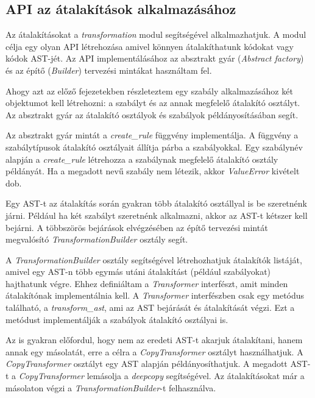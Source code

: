 \pagebreak

\subsection{API az átalakítások alkalmazásához}

Az átalakításokat a \emph{transformation} modul segítségével alkalmazhatjuk.
A modul célja egy olyan API létrehozása amivel könnyen átalakíthatunk kódokat vagy kódok AST-jét.
Az API implementálásához az absztrakt gyár (\emph{Abstract factory}) és az építő (\emph{Builder})
tervezési mintákat használtam fel.

Ahogy azt az előző fejezetekben részleteztem
egy szabály alkalmazásához két objektumot kell létrehozni:
a szabályt és az annak megfelelő átalakító osztályt.
Az absztrakt gyár az átalakító osztályok és szabályok példányosításában segít.

Az absztrakt gyár mintát a \emph{create\_rule} függvény implementálja.
A függvény a szabálytípusok átalakító osztályait állítja párba a szabályokkal.
Egy szabálynév alapján a \emph{create\_rule} létrehozza
a szabálynak megfelelő átalakító osztály példányát.
Ha a megadott nevű szabály nem létezik, akkor \emph{ValueError} kivételt dob.

Egy AST-t az átalakítás során gyakran több átalakító osztállyal is be szeretnénk járni.
Például ha két szabályt szeretnénk alkalmazni, akkor az AST-t kétszer kell bejárni.
A többszörös bejárások elvégzésében az építő tervezési mintát megvalósító
\emph{TransformationBuilder} osztály segít.

A \emph{TransformationBuilder} osztály segítségével
létrehozhatjuk átalakítók listáját, amivel egy AST-n több egymás utáni átalakítást
(például szabályokat) hajthatunk végre.
Ehhez definiáltam a \emph{Transformer} interfészt, amit minden átalakítónak
implementálnia kell.
A \emph{Transformer} interfészben csak egy metódus található, a \emph{transform\_ast},
ami az AST bejárását és átalakítását végzi.
Ezt a metódust implementálják a szabályok átalakító osztályai is.

Az is gyakran előfordul, hogy nem az eredeti AST-t akarjuk átalakítani, hanem annak egy másolatát,
erre a célra a \emph{CopyTransformer} osztályt használhatjuk.
A \emph{CopyTransformer} osztályt egy AST alapján példányosíthatjuk.
A megadott AST-t a \emph{CopyTransformer} lemásolja a \emph{deepcopy} segítségével.
Az átalakításokat már a másolaton végzi a \emph{TransformationBuilder}-t felhasználva.

\pagebreak

